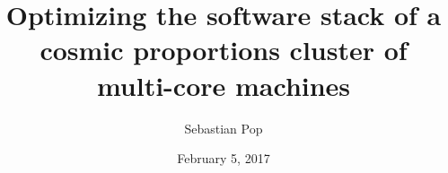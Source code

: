 \documentclass{beamer}
\begin{document}
\title{Optimizing the software stack of a cosmic proportions cluster of multi-core machines}
\author{Sebastian Pop}
\date{February 5, 2017}

\frame{\titlepage}

\frame{\frametitle{}
}
\end{document}
